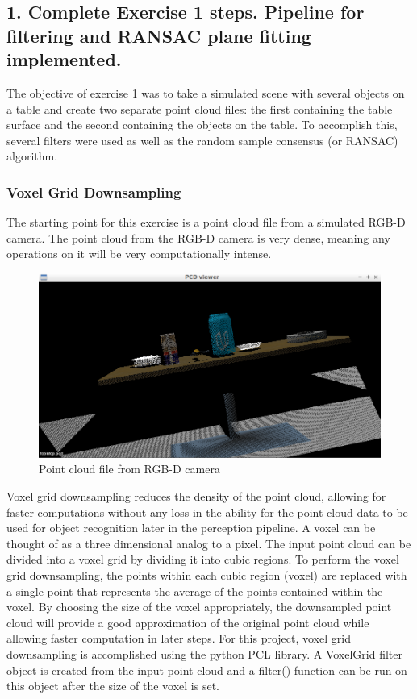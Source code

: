 \documentclass{article}
\begin{document}
\subsection{1. Complete Exercise 1 steps. Pipeline for filtering and RANSAC plane fitting implemented.}
The objective of exercise 1 was to take a simulated scene with several objects on a table and create two separate point cloud files: the first containing the table surface and the second containing the objects on the table. To accomplish this, several filters were used as well as the random sample consensus (or RANSAC) algorithm.

\subsubsection{Voxel Grid Downsampling}
The starting point for this exercise is a point cloud file from a simulated RGB-D camera. The point cloud from the RGB-D camera is very dense, meaning any operations on it will be very computationally intense.

\begin{figure}[H]
    \includegraphics[width=\linewidth]{ex1tabletop.png}
    \caption{Point cloud file from RGB-D camera}
    \label{fig:camera}
\end{figure}

Voxel grid downsampling reduces the density of the point cloud, allowing for faster computations without any loss in the ability for the point cloud data to be used for object recognition later in the perception pipeline. A voxel can be thought of as a three dimensional analog to a pixel. The input point cloud can be divided into a voxel grid by dividing it into cubic regions. To perform the voxel grid downsampling, the points within each cubic region (voxel) are replaced with a single point that represents the average of the points contained within the voxel. By choosing the size of the voxel appropriately, the downsampled point cloud will provide a good approximation of the original point cloud while allowing faster computation in later steps.
For this project, voxel grid downsampling is accomplished using the python PCL library. A VoxelGrid filter object is created from the input point cloud and a filter() function can be run on this object after the size of the voxel is set.
\end{document}
